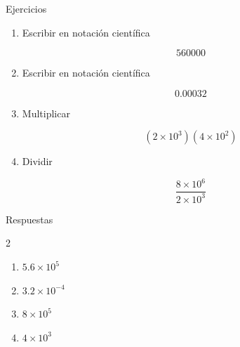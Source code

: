 \documentclass[aspectratio=169,10pt,handout]{beamer}
\begin{document}
	\begin{frame}{Ejercicios}
		
		\begin{enumerate}
			
			\item Escribir en notación científica
			
			\[
			560000
			\]
			
			\item Escribir en notación científica
			
			\[
			0.00032
			\]
			
			\item Multiplicar
			
			\[
			(2\times10^3)(4\times10^2)
			\]
			
			\item Dividir
			
			\[
			\frac{8\times10^6}{2\times10^3}
			\]
			
		\end{enumerate}
		
	\end{frame}
	
	\begin{frame}{Respuestas}
		
		\begin{multicols}{2}
			
			\begin{enumerate}
				
				\item \(5.6\times10^5\)
				
				\item \(3.2\times10^{-4}\)
				
				\item \(8\times10^5\)
				
				\item \(4\times10^3\)
				
			\end{enumerate}
			
		\end{multicols}
		
	\end{frame}
	
\end{document}
